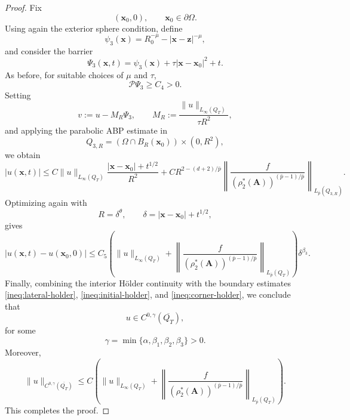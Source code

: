 \documentclass[final,onefignum,onetabnum]{mousaviart}
\begin{document}
\begin{proof}
		Fix
		\[
		(\boldsymbol{x}_0,0),
		\qquad
		\boldsymbol{x}_0\in\partial\Omega.
		\]
		Using again the exterior sphere condition, define
		\[
		\psi_3(\boldsymbol{x})
		=
		R_0^{-\mu}-|\boldsymbol{x}-\boldsymbol{z}|^{-\mu},
		\]
		and consider the barrier
		\[
		\Psi_3(\boldsymbol{x},t)
		=
		\psi_3(\boldsymbol{x})
		+
		\tau |\boldsymbol{x}-\boldsymbol{x}_0|^2
		+
		t.
		\]
		As before, for suitable choices of \(\mu\) and \( \tau \),
		\[
		\mathcal{P} \Psi_3\ge C_4>0.
		\]
		Setting
		\[
		v:=u-M_R\Psi_3,
		\qquad
		M_R
		:=
		\frac{\|u\|_{L_\infty(Q_T)}}{\tau R^2},
		\]
		and applying the parabolic ABP estimate in
		\[
		Q_{3,R}
		=
		(\Omega\cap B_R(\boldsymbol{x}_0))
		\times
		(0,R^2),
		\]
		we obtain
		\[
		|u(\boldsymbol{x},t)|
		\le
		C
		\|u\|_{L_\infty(Q_T)}
		\frac{
			|\boldsymbol{x}-\boldsymbol{x}_0|
			+
			t^{1/2}
		}{R^2}
		+
		C
		R^{2-(d+2)/\bar p}
		\left\|
		\frac{f}{(\rho_2^\ast(\boldsymbol{A}))^{(\bar p-1)/\bar p}}
		\right\|_{L_{\bar p}(Q_{3,R})}.
		\]
		Optimizing again with
		\[
		R=\delta^\theta,
		\qquad
		\delta
		=
		|\boldsymbol{x}-\boldsymbol{x}_0|
		+
		t^{1/2},
		\]
		gives
		\begin{equation}
			\label{ineq:corner-holder}
			|u(\boldsymbol{x},t)-u(\boldsymbol{x}_0,0)|
			\le
			C_5
			\left(
			\|u\|_{L_\infty(Q_T)}
			+
			\left\|
			\frac{f}{(\rho_2^\ast(\boldsymbol{A}))^{(\bar p-1)/\bar p}}
			\right\|_{L_{\bar p}(Q_T)}
			\right)
			\delta^{\beta_3}.
		\end{equation}
		\medskip
		Finally, combining the interior Hölder continuity with the boundary estimates
		\eqref{ineq:lateral-holder},
		\eqref{ineq:initial-holder},
		and
		\eqref{ineq:corner-holder},
		we conclude that
		\[
		u\in C^{0,\gamma}(\overline{Q_T}),
		\]
		for some
		\[
		\gamma
		=
		\min\{\alpha,\beta_1,\beta_2,\beta_3\}>0.
		\]
		Moreover,
		\[
		\|u\|_{C^{0,\gamma}(\overline{Q_T})}
		\le
		C
		\left(
		\|u\|_{L_\infty(Q_T)}
		+
		\left\|
		\frac{f}{(\rho_2^\ast(\boldsymbol{A}))^{(\bar p-1)/\bar p}}
		\right\|_{L_{\bar p}(Q_T)}
		\right).
		\]
		This completes the proof.
	\end{proof}
\end{document}
